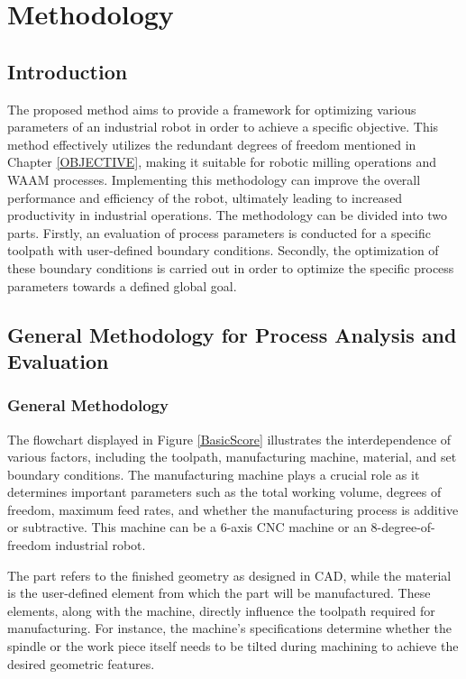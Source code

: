 \chapter{Methodology}%

\section{Introduction}%

The proposed method aims to provide a framework for optimizing various parameters of an industrial robot in order to achieve a specific objective. This method effectively utilizes the redundant degrees of freedom mentioned in Chapter \ref{OBJECTIVE}, making it suitable for robotic milling operations and WAAM processes. Implementing this methodology can improve the overall performance and efficiency of the robot, ultimately leading to increased productivity in industrial operations. The methodology can be divided into two parts. Firstly, an evaluation of process parameters is conducted for a specific toolpath with user-defined boundary conditions. Secondly, the optimization of these boundary conditions is carried out in order to optimize the specific process parameters towards a defined global goal.

\section{General Methodology for Process Analysis and Evaluation}
\subsection{General Methodology}\label{general}

The flowchart displayed in Figure \ref{BasicScore} illustrates the interdependence of various factors, including the toolpath, manufacturing machine, material, and set boundary conditions. The manufacturing machine plays a crucial role as it determines important parameters such as the total working volume, degrees of freedom, maximum feed rates, and whether the manufacturing process is additive or subtractive. This machine can be a 6-axis CNC machine or an 8-degree-of-freedom industrial robot.

The part refers to the finished geometry as designed in CAD, while the material is the user-defined element from which the part will be manufactured. These elements, along with the machine, directly influence the toolpath required for manufacturing. For instance, the machine's specifications determine whether the spindle or the work piece itself needs to be tilted during machining to achieve the desired geometric features.


